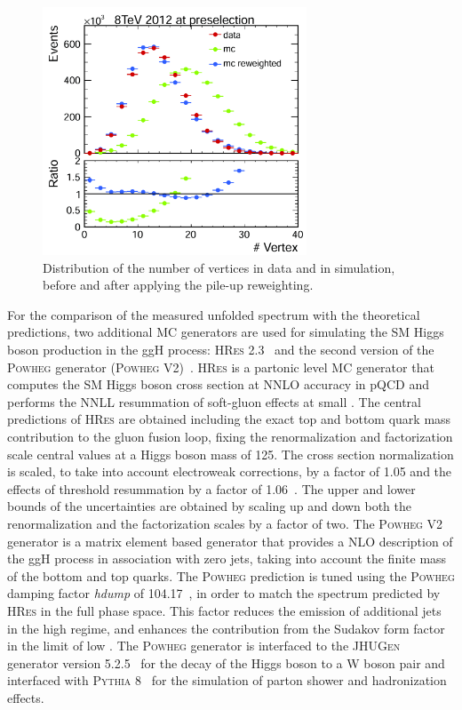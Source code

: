 \begin{figure}[htb]
\centering
\includegraphics[width=0.7\textwidth]{images/nvertex.pdf}
\caption{Distribution of the number of vertices in data and in simulation, before and after applying the pile-up reweighting.}\label{fig:nvertices}
\end{figure}

For the comparison of the measured unfolded spectrum with the theoretical predictions, two additional MC generators are used for simulating the SM Higgs boson production in the ggH process: \textsc{HRes} 2.3~\cite{deFlorian:2012mx,Grazzini:2013mca} and the second version of the \textsc{Powheg} generator (\textsc{Powheg V2})~\cite{Bagnaschi:2011tu}.
\textsc{HRes} is a partonic level MC generator that computes the SM Higgs
boson cross section at NNLO accuracy in pQCD and performs the NNLL
resummation of soft-gluon effects at small \pt. The central predictions of
\textsc{HRes} are obtained including the exact top and bottom quark mass contribution to
the gluon fusion loop, fixing the renormalization and factorization scale central values at a Higgs boson mass of 125\GeV. The cross section normalization is scaled, to take into account electroweak corrections, by a factor of 1.05 and the effects of threshold resummation by a factor of 1.06~\cite{Actis:2008ug,Catani:2003zt}. The upper and lower bounds of the uncertainties are obtained by scaling up and down both the renormalization and the factorization scales by a factor of two.
The \textsc{Powheg V2} generator is a matrix element based generator that provides a NLO description of the ggH process in association with zero jets, taking into account the finite mass of the bottom and top quarks.
The \textsc{Powheg} prediction is tuned using the \textsc{Powheg} damping factor \textit{hdump} of 104.17~\GeV, in order to match the \pth{} spectrum predicted by \textsc{HRes} in the full phase space. This factor reduces the emission of additional jets in the high \pt regime, and enhances the contribution from the Sudakov form factor in the limit of low \pt.
The \textsc{Powheg} generator is interfaced to the \textsc{JHUGen} generator version 5.2.5~\cite{Gao:2010qx,Bolognesi:2012mm,Anderson:2013afp} for the decay of the Higgs boson to a W boson pair and interfaced with \textsc{Pythia 8}~\cite{Sjostrand:2007gs} for the simulation of parton shower and hadronization effects.
